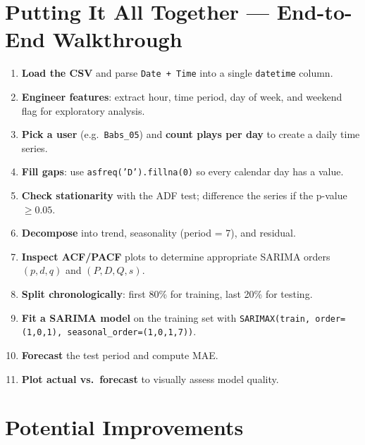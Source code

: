 \documentclass[12pt, a4paper]{article}
\begin{document}
\section{Putting It All Together — End-to-End Walkthrough}

\begin{enumerate}[leftmargin=*, label=\textbf{Step \arabic*}.]
    \item \textbf{Load the CSV} and parse \texttt{Date + Time} into a
          single \texttt{datetime} column.
    \item \textbf{Engineer features}: extract hour, time period, day of week,
          and weekend flag for exploratory analysis.
    \item \textbf{Pick a user} (e.g.\ \texttt{Babs\_05}) and \textbf{count
          plays per day} to create a daily time series.
    \item \textbf{Fill gaps}: use \texttt{asfreq('D').fillna(0)} so every
          calendar day has a value.
    \item \textbf{Check stationarity} with the ADF test; difference the
          series if the p-value $\geq 0.05$.
    \item \textbf{Decompose} into trend, seasonality (period = 7), and
          residual.
    \item \textbf{Inspect ACF/PACF} plots to determine appropriate SARIMA
          orders $(p, d, q)$ and $(P, D, Q, s)$.
    \item \textbf{Split chronologically}: first 80\% for training, last
          20\% for testing.
    \item \textbf{Fit a SARIMA model} on the training set with
          \texttt{SARIMAX(train, order=(1,0,1),
          seasonal\_order=(1,0,1,7))}.
    \item \textbf{Forecast} the test period and compute MAE.
    \item \textbf{Plot actual vs.\ forecast} to visually assess model
          quality.
\end{enumerate}

\section{Potential Improvements}
\end{document}
